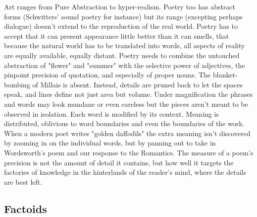 \documentclass[11pt]{article}
\begin{document}
Art ranges from Pure Abstraction to hyper-realism. Poetry too has abstract forms (Schwitters' sound poetry for instance) but its range (excepting perhaps dialogue) doesn't extend to the reproduction of the real world. Poetry has to accept that it can present appearance little better than it can smells, that because the natural world has to be translated into words, all aspects of reality are equally available, equally distant. Poetry needs to combine the untouched abstraction of "flower" and "summer" with the selective power of adjectives, the pinpoint precision of quotation, and especially of proper nouns. The blanket-bombing of Millais is absent. Instead, details are pruned back to let the spaces speak, and lines define not just area but volume. Under magnification the phrases and words may look mundane or even careless but the pieces aren't meant to be observed in isolation. Each word is modified by its context. Meaning is distributed, oblivious to word boundaries and even the boundaries of the work. When a modern poet writes "golden daffodils" the extra meaning isn't discovered by zooming in on the individual words, but by panning out to take in Wordsworth's poem and our response to the Romantics. The measure of a poem's precision is not the amount of detail it contains, but how well it targets the factories of knowledge in the hinterlands of the reader's mind, where the details are best left.


\newpage\subsection{Factoids}
\end{document}
